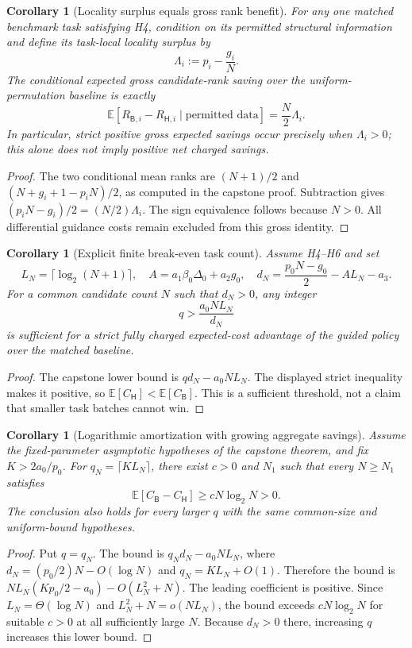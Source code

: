 \documentclass[11pt,letterpaper]{article}
\newtheorem{corollary}[theorem]{Corollary}
\theoremstyle{definition}
\theoremstyle{remark}
\newcommand{\Hsys}{\mathsf H}
\newcommand{\Bsys}{\mathsf B}
\begin{document}
\begin{corollary}[Locality surplus equals gross rank benefit]\label{cor:surplus}
For any one matched benchmark task satisfying H4, condition on its permitted structural information and define its task-local locality surplus by
\[
 \Lambda_i:=p_i-\frac{g_i}{N}.
\]
The conditional expected \emph{gross} candidate-rank saving over the uniform-permutation baseline is exactly
\[
 \mathbb E[R_{\Bsys,i}-R_{\Hsys,i}\mid\text{permitted data}]
 =\frac{N}{2}\Lambda_i.
\]
In particular, strict positive \emph{gross} expected savings occur precisely when $\Lambda_i>0$; this alone does not imply positive \emph{net} charged savings.
\end{corollary}
\begin{proof}
The two conditional mean ranks are $(N+1)/2$ and $(N+g_i+1-p_iN)/2$, as computed in the capstone proof. Subtraction gives $(p_iN-g_i)/2=(N/2)\Lambda_i$. The sign equivalence follows because $N>0$. All differential guidance costs remain excluded from this gross identity.
\end{proof}

\begin{corollary}[Explicit finite break-even task count]\label{cor:break-even}
Assume H4--H6 and set
\[
 L_N=\lceil\log_2(N+1)\rceil,\quad
 A=a_1\beta_0\Delta_0+a_2g_0,\quad
 d_N=\frac{p_0N-g_0}{2}-A L_N-a_3.
\]
For a common candidate count $N$ such that $d_N>0$, any integer
\[
 \boxed{q>\frac{a_0N L_N}{d_N}}
\]
is sufficient for a strict fully charged expected-cost advantage of the guided policy over the matched baseline.
\end{corollary}
\begin{proof}
The capstone lower bound is $q d_N-a_0N L_N$. The displayed strict inequality makes it positive, so $\mathbb E[C_{\Hsys}]<\mathbb E[C_{\Bsys}]$. This is a sufficient threshold, not a claim that smaller task batches cannot win.
\end{proof}

\begin{corollary}[Logarithmic amortization with growing aggregate savings]\label{cor:log}
Assume the fixed-parameter asymptotic hypotheses of the capstone theorem, and fix $K>2a_0/p_0$. For $q_N=\lceil K L_N\rceil$, there exist $c>0$ and $N_1$ such that every $N\ge N_1$ satisfies
\[
 \mathbb E[C_{\Bsys}-C_{\Hsys}]\ge cN\log_2 N>0.
\]
The conclusion also holds for every larger $q$ with the same common-size and uniform-bound hypotheses.
\end{corollary}
\begin{proof}
Put $q=q_N$. The bound is $q_N d_N-a_0N L_N$, where
$d_N=(p_0/2)N-O(\log N)$ and $q_N=K L_N+O(1)$.
Therefore the bound is
$N L_N(Kp_0/2-a_0)-O(L_N^2+N)$.
The leading coefficient is positive. Since $L_N=\Theta(\log N)$ and $L_N^2+N=o(NL_N)$, the bound exceeds $cN\log_2N$ for suitable $c>0$ at all sufficiently large $N$. Because $d_N>0$ there, increasing $q$ increases this lower bound.
\end{proof}
\end{document}
